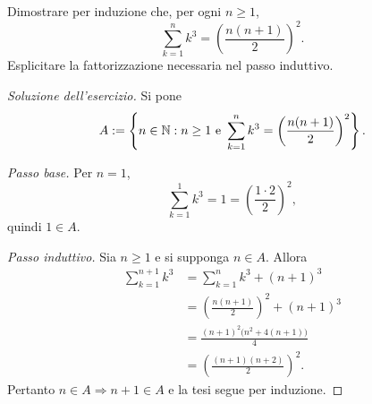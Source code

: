 \begin{exercise}
\label{ex:fondamenti-somma-dei-cubi}
Dimostrare per induzione che, per ogni $n\ge1$,
\[
  \sum_{k=1}^{n}k^3=\left(\frac{n(n+1)}{2}\right)^2.
\]
Esplicitare la fattorizzazione necessaria nel passo induttivo.
\end{exercise}
\begin{proof}[Soluzione dell'esercizio]
Si pone
\[
  A:=\left\{n\in\mathbb{N}:n\ge1\ \text{e}\
    \sum_{k=1}^{n}k^3=\left(\frac{n(n+1)}{2}\right)^2\right\}.
\]

\emph{Passo base.} Per $n=1$,
\[
  \sum_{k=1}^{1}k^3=1=\left(\frac{1\cdot2}{2}\right)^2,
\]
quindi $1\in A$.

\emph{Passo induttivo.} Sia $n\ge1$ e si supponga $n\in A$. Allora
\[
\begin{aligned}
  \sum_{k=1}^{n+1}k^3
    &=\sum_{k=1}^{n}k^3+(n+1)^3\\
    &=\left(\frac{n(n+1)}{2}\right)^2+(n+1)^3\\
    &=\frac{(n+1)^2\bigl(n^2+4(n+1)\bigr)}{4}\\
    &=\left(\frac{(n+1)(n+2)}{2}\right)^2.
\end{aligned}
\]
Pertanto $n\in A\Rightarrow n+1\in A$ e la tesi segue per induzione.
\end{proof}
